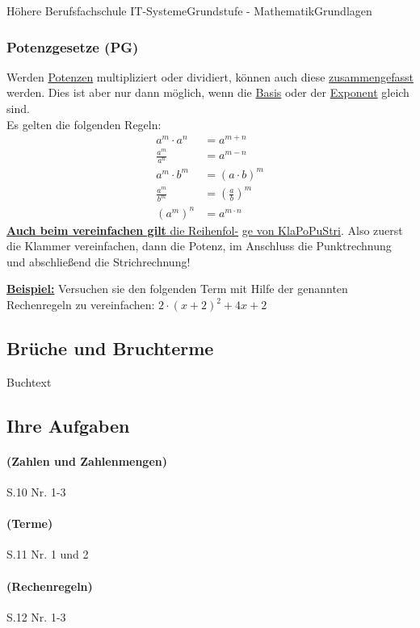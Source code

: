 \documentclass[11pt,twocolumn,oneside,openany,headings=optiontotoc,11pt,numbers=noenddot]{article}
\begin{document}
\begin{worksheet}{Höhere Berufsfachschule IT-Systeme}{Grundstufe - Mathematik}{Grundlagen}
		\subsubsection*{Potenzgesetze (PG)}
		Werden \underline{Potenzen} multipliziert oder dividiert, können auch diese \underline{zusammengefasst} werden. Dies ist aber nur dann möglich, wenn die \underline{Basis} oder der \underline{Exponent} gleich sind.\\
		Es gelten die folgenden Regeln:
		\begin{align*}
			a^m\cdot{}a^n & = a ^{m+n}\\
			\frac{a^m}{a^n} & = a^{m-n}\\
			a^m\cdot{}b^m & = (a\cdot{}b)^m\\
			\frac{a^m}{b^m} & = \left(\frac{a}{b}\right)^m\\
			(a^m)^n & = a^{m\cdot{}n}
		\end{align*}
		\newpage
		\underline{\textbf{Auch beim vereinfachen gilt} die Reihenfol-} \underline{ge von \color{red}KlaPoPuStri\normalcolor}. Also zuerst die Klammer vereinfachen, dann die Potenz, im Anschluss die Punktrechnung und abschließend die Strichrechnung!\\
		\par\bigskip\noindent
		\underline{\textbf{Beispiel:}} Versuchen sie den folgenden Term mit Hilfe der genannten Rechenregeln zu vereinfachen: \(2\cdot{}(x+2)^2 + 4x + 2\)
		\subsection{Brüche und Bruchterme}
		Buchtext
		\subsection{Ihre Aufgaben}
		\paragraph{(Zahlen und Zahlenmengen)} S.10 Nr. 1-3\\
		\paragraph{(Terme)} S.11 Nr. 1 und 2\\
		\paragraph{(Rechenregeln)} S.12 Nr. 1-3\\

\end{worksheet}
\end{document}
